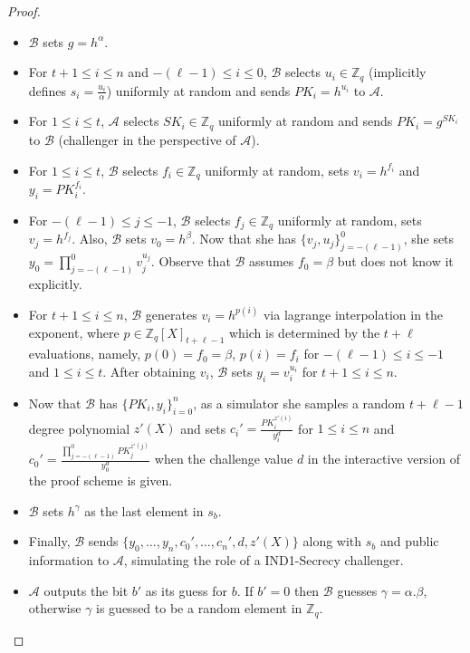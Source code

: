 \begin{proof}
\begin{itemize}
      \begin{itemize}
        \item $\mathcal{B}$ sets $g=h^\alpha$.
        \item For $t+1\leq i\leq n$ and $-(\ell-1)\leq i\leq 0$, $\mathcal{B}$ selects $u_i\in\mathbb{Z}_q$ (implicitly 
          defines $s_i=\frac{u_i}{\alpha}$) uniformly at random and sends 
          $PK_i=h^{u_i}$ to $\mathcal{A}$.
        \item For $1\leq i\leq t$, $\mathcal{A}$ selects $SK_i\in\mathbb{Z}_q$ uniformly at 
          random and sends $PK_i=g^{SK_i}$ to $\mathcal{B}$ (challenger in the perspective 
          of $\mathcal{A}$).
        \item For $1\leq i\leq t$, $\mathcal{B}$ selects $f_i\in\mathbb{Z}_q$ uniformly at random,
          sets $v_i=h^{f_i}$ and $y_i=PK_i^{f_i}$.
        \item For $-(\ell-1)\leq j\leq -1$, $\mathcal{B}$ selects $f_j\in\mathbb{Z}_q$ 
          uniformly at random, sets $v_j=h^{f_j}$. Also, $\mathcal{B}$ sets $v_0=h^{\beta}$. Now that 
          she has $\{v_j,u_j\}_{j=-(\ell-1)}^0$, she sets $y_0=\prod_{j=-(\ell-1)}^{0}v_j^{u_j}$. 
          Observe that $\mathcal{B}$ assumes $f_0=\beta$ but does not know it explicitly.
        \item For $t+1\leq i\leq n$, $\mathcal{B}$ generates $v_i=h^{p(i)}$ via lagrange interpolation
          in the exponent, where $p\in\mathbb{Z}_q[X]_{t+\ell-1}$ which is determined by the 
          $t+\ell$ evaluations, namely, $p(0)=f_0=\beta$, $p(i)=f_i$ for 
          $-(\ell-1)\leq i\leq -1$ and $1\leq i\leq t$. After obtaining $v_i$, 
          $\mathcal{B}$ sets $y_i=v_i^{u_i}$ for $t+1\leq i\leq n$.
        \item Now that $\mathcal{B}$ has $\{PK_i,y_i\}_{i=0}^n$, as a simulator she samples a 
          random $t+\ell-1$ degree polynomial $z'(X)$ and sets $c_i'=\frac{PK_i^{z'(i)}}{y_i^d}$ for 
          $1\leq i\leq n$ and $c_0'=\frac{\prod_{j=-(\ell-1)}^{0}PK_j^{z'(j)}}{y_0^d}$ 
          when the challenge value $d$ in the interactive version of the proof scheme is given.
        \item $\mathcal{B}$ sets $h^\gamma$ as the last element in $s_b$.
        \item Finally, $\mathcal{B}$ sends $\{y_0,\dots,y_n,c_0',\dots,c_n',d,z'(X)\}$ 
          along with $s_b$ and public information to $\mathcal{A}$, simulating the role of a 
          IND1-Secrecy challenger.
        \item $\mathcal{A}$ outputs the bit $b'$ as its guess for $b$. If $b'=0$ then 
          $\mathcal{B}$ guesses $\gamma=\alpha.\beta$, otherwise $\gamma$ is guessed to be 
          a random element in $\mathbb{Z}_q$.
      \end{itemize}
  \end{itemize}
\end{proof}

